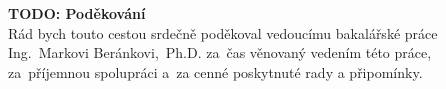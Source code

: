 \newpage
\pagestyle{empty}

\noindent
{\large\bfseries TODO: Poděkování}\\

\noindent
Rád bych touto cestou srdečně poděkoval vedoucímu bakalářské práce Ing.~Markovi Beránkovi,~Ph.D. za~čas věnovaný vedením této práce, za~příjemnou spolupráci a~za cenné poskytnuté rady a připomínky.
